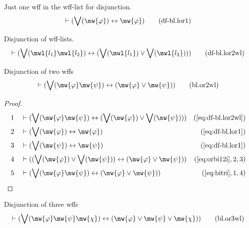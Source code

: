 \begin{metadefinition} {Just one wff in the wff-list for
disjunction.}
\begin{align}
\vdash ( \bigvee( \mw{\varphi} ) \leftrightarrow \mw{\varphi}
    )\label{eq:df-bl.lor1}\tag{df-bl.lor1}
\end{align}
\end{metadefinition}


\begin{metadefinition} {Disjunction of wff-lists.}
\begin{align}
\vdash ( \bigvee( \mwl{l_1} \mwl{l_2} ) \leftrightarrow ( \bigvee( \mwl{l_1} )
    \vee \bigvee( \mwl{l_2} ) ) )\label{eq:df-bl.lor2wl}\tag{df-bl.lor2wl}
\end{align}
\end{metadefinition}


\begin{lemma} {Disjunction of two wffs}
\begin{align}
\vdash ( \bigvee( \mw{\varphi} \mw{\psi} ) \leftrightarrow ( \mw{\varphi} \vee
    \mw{\psi} ) )\label{eq:bl.or2wl}\tag{bl.or2wl}
\end{align}
\end{lemma}


\begin{proof}
\begin{align}
  1 &&  & \vdash ( \bigvee( \mw{\varphi} \mw{\psi} ) \leftrightarrow ( \bigvee(
     \mw{\varphi} ) \vee \bigvee( \mw{\psi} ) )
     )&(\mbox{\ref{eq:df-bl.lor2wl}})\notag
  \\ 2 &&  & \vdash ( \bigvee( \mw{\varphi} ) \leftrightarrow \mw{\varphi}
     )&(\mbox{\ref{eq:df-bl.lor1}})\notag
  \\ 3 &&  & \vdash ( \bigvee( \mw{\psi} ) \leftrightarrow \mw{\psi}
     )&(\mbox{\ref{eq:df-bl.lor1}})\notag
  \\ 4 &&  & \vdash ( ( \bigvee( \mw{\varphi} ) \vee \bigvee( \mw{\psi} ) )
     \leftrightarrow ( \mw{\varphi} \vee \mw{\psi} )
     )&(\mbox{\ref{eq:orbi12i}},2,3)\notag
  \\ 5 &&  & \vdash ( \bigvee( \mw{\varphi} \mw{\psi} ) \leftrightarrow (
     \mw{\varphi} \vee \mw{\psi} )
     )&(\mbox{\ref{eq:bitri}},1,4)\notag
\end{align}
\end{proof}

\begin{lemma} {Disjunction of three wffs}
\begin{align}
\vdash ( \bigvee( \mw{\varphi} \mw{\psi} \mw{\chi} ) \leftrightarrow (
    \mw{\varphi} \vee \mw{\psi} \vee \mw{\chi} )
    )\label{eq:bl.or3wl}\tag{bl.or3wl}
\end{align}
\end{lemma}


